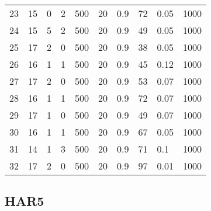 \begin{table*}[h!]
\begin{adjustbox}{width=\textwidth}
\begin{tabular}{l|lllllllll}
        23& 15 & 0 & 2 & 500 & 20 & 0.9 & 72 & 0.05 & 1000 \\ 
        24& 15 & 5 & 2 & 500 & 20 & 0.9 & 49 & 0.05 & 1000 \\ 
        25& 17 & 2 & 0 & 500 & 20 & 0.9 & 38 & 0.05 & 1000 \\ 
        26& 16 & 1 & 1 & 500 & 20 & 0.9 & 45 & 0.12 & 1000 \\ 
        27& 17 & 2 & 0 & 500 & 20 & 0.9 & 53 & 0.07 & 1000 \\ 
        28& 16 & 1 & 1 & 500 & 20 & 0.9 & 72 & 0.07 & 1000 \\ 
        29& 17 & 1 & 0 & 500 & 20 & 0.9 & 49 & 0.07 & 1000 \\ 
        30& 16 & 1 & 1 & 500 & 20 & 0.9 & 67 & 0.05 & 1000 \\ 
        31& 14 & 1 & 3 & 500 & 20 & 0.9 & 71 & 0.1 & 1000 \\ 
        32& 17 & 2 & 0 & 500 & 20 & 0.9 & 97 & 0.01 & 1000 \\
        \bottomrule[0.5mm]
    \end{tabular}
    \end{adjustbox}
\end{table*}


\subsection{HAR5}

